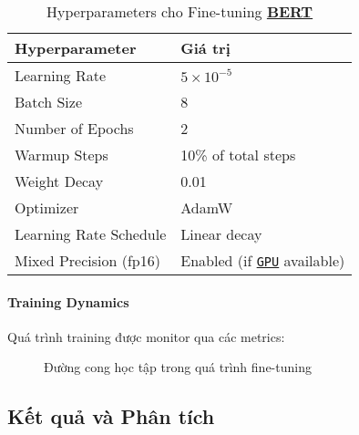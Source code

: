 \begin{table}[H]
\centering
\caption{Hyperparameters cho Fine-tuning \hyperref[acro:bert]{\textbf{BERT}}}
\label{tab:finetuning_params}
\begin{tabular}{ll}
\toprule
\textbf{Hyperparameter} & \textbf{Giá trị} \\
\midrule
Learning Rate & $5 \times 10^{-5}$ \\
Batch Size & 8 \\
Number of Epochs & 2 \\
Warmup Steps & 10\% of total steps \\
Weight Decay & 0.01 \\
Optimizer & AdamW \\
Learning Rate Schedule & Linear decay \\
Mixed Precision (fp16) & Enabled (if \hyperref[acro:gpu]{\texttt{GPU}} available) \\
\bottomrule
\end{tabular}
\end{table}

\paragraph{Training
Dynamics}
Quá trình training được monitor qua các metrics:

\begin{figure}[H]
\centering
{}
\caption{Đường cong học tập trong quá trình fine-tuning}
\label{fig:training_curves}
\end{figure}

\subsection{Kết quả và Phân tích}
\label{ssec:ket_qua_phan_tich}

